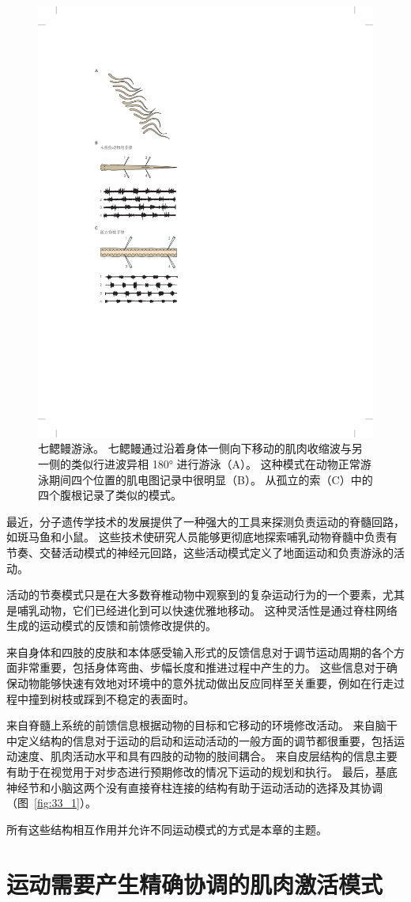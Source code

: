 \begin{figure}[htbp]
	\centering
	\includegraphics[width=0.45\linewidth]{chap33/fig_33_3}
	\caption{七鳃鳗游泳。
	七鳃鳗通过沿着身体一侧向下移动的肌肉收缩波与另一侧的类似行进波异相 180° 进行游泳（A）。
	这种模式在动物正常游泳期间四个位置的肌电图记录中很明显（B）。
	从孤立的索（C）中的四个腹根记录了类似的模式。}
	\label{fig:33_3}
\end{figure}


最近，分子遗传学技术的发展提供了一种强大的工具来探测负责运动的脊髓回路，如斑马鱼和小鼠。
这些技术使研究人员能够更彻底地探索哺乳动物脊髓中负责有节奏、交替活动模式的神经元回路，这些活动模式定义了地面运动和负责游泳的活动。


活动的节奏模式只是在大多数脊椎动物中观察到的复杂运动行为的一个要素，尤其是哺乳动物，它们已经进化到可以快速优雅地移动。
这种灵活性是通过脊柱网络生成的运动模式的反馈和前馈修改提供的。


来自身体和四肢的皮肤和本体感受输入形式的反馈信息对于调节运动周期的各个方面非常重要，包括身体弯曲、步幅长度和推进过程中产生的力。
这些信息对于确保动物能够快速有效地对环境中的意外扰动做出反应同样至关重要，例如在行走过程中撞到树枝或踩到不稳定的表面时。


来自脊髓上系统的前馈信息根据动物的目标和它移动的环境修改活动。
来自脑干中定义结构的信息对于运动的启动和运动活动的一般方面的调节都很重要，包括运动速度、肌肉活动水平和具有四肢的动物的肢间耦合。
来自皮层结构的信息主要有助于在视觉用于对步态进行预期修改的情况下运动的规划和执行。
最后，基底神经节和小脑这两个没有直接脊柱连接的结构有助于运动活动的选择及其协调（图~\ref{fig:33_1}）。


所有这些结构相互作用并允许不同运动模式的方式是本章的主题。



\section{运动需要产生精确协调的肌肉激活模式}

